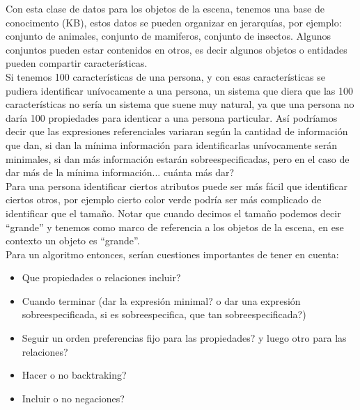 Con esta clase de datos para los objetos de la escena, tenemos una base de conocimento (KB), estos datos se pueden organizar en jerarqu\'ias, por ejemplo: conjunto de animales, conjunto de mamiferos, conjunto de insectos. Algunos conjuntos pueden estar contenidos en otros, es decir algunos objetos o entidades pueden compartir caracter\'isticas.\\

Si tenemos 100 caracter\'isticas de una persona, y con esas caracter\'isticas se pudiera identificar un\'ivocamente a una persona, un sistema que diera que las 100 caracter\'isticas no ser\'ia un sistema que suene muy natural, ya que una persona no dar\'ia 100 propiedades para identicar a una persona particular. As\'i podr\'iamos decir que las expresiones referenciales variaran seg\'un la cantidad de informaci\'on que dan, si dan la m\'inima informaci\'on para identificarlas un\'ivocamente ser\'an minimales, si dan m\'as informaci\'on estar\'an sobreespecificadas, pero en el caso de dar m\'as de la m\'inima informaci\'on... cu\'anta m\'as dar?\\


Para una persona identificar ciertos atributos puede ser m\'as f\'acil que identificar ciertos otros, por ejemplo cierto color verde podr\'{i}a ser m\'as complicado de identificar que el tama\~no. Notar que cuando decimos el tama\~no podemos decir ``grande'' y tenemos como marco de referencia a los objetos de la escena, en ese contexto un objeto es ``grande''.\\

Para un algoritmo entonces, ser\'ian cuestiones importantes de tener en cuenta:

\begin{itemize}
 \item Que propiedades o relaciones incluir?
 \item Cuando terminar (dar la expresi\'on minimal? o dar una expresi\'on sobreespecificada, si es sobreespecifica, que tan sobreespecificada?)
 \item Seguir un orden preferencias fijo para las propiedades? y luego otro para las relaciones?
 \item Hacer o no backtraking?
 \item Incluir o no negaciones?
\end{itemize}


